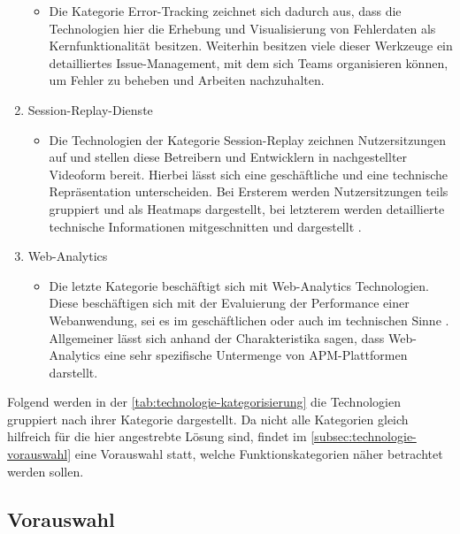 \begin{enumerate}
	\begin{itemize}
		\item Die Kategorie Error-Tracking zeichnet sich dadurch aus, dass die Technologien hier die Erhebung und Visualisierung von Fehlerdaten als Kernfunktionalität besitzen. Weiterhin besitzen viele dieser Werkzeuge ein detailliertes Issue-Management, mit dem sich Teams organisieren können, um Fehler zu beheben und Arbeiten nachzuhalten.
	\end{itemize}
	\item Session-Replay-Dienste
	\begin{itemize}
		\item Die Technologien der Kategorie Session-Replay zeichnen Nutzersitzungen auf und stellen diese Betreibern und Entwicklern in nachgestellter Videoform bereit. Hierbei lässt sich eine geschäftliche und eine technische Repräsentation unterscheiden. Bei Ersterem werden Nutzersitzungen teils gruppiert und als Heatmaps dargestellt, bei letzterem werden detaillierte technische Informationen mitgeschnitten und dargestellt \cite{Webalyt}.
	\end{itemize}
	\item Web-Analytics
	\begin{itemize}
		\item Die letzte Kategorie beschäftigt sich mit Web-Analytics Technologien. Diese beschäftigen sich mit der Evaluierung der Performance einer Webanwendung, sei es im geschäftlichen oder auch im technischen Sinne \cite{APracticalEvaluationOfWebAnalytics} \cite{WebAnalyticsAnHourADay}. Allgemeiner lässt sich anhand der Charakteristika sagen, dass Web-Analytics eine sehr spezifische Untermenge von APM-Plattformen darstellt.
	\end{itemize}
\end{enumerate}

Folgend werden in der \autoref{tab:technologie-kategorisierung} die Technologien gruppiert nach ihrer Kategorie dargestellt. Da nicht alle Kategorien gleich hilfreich für die hier angestrebte Lösung sind, findet im \autoref{subsec:technologie-vorauswahl} eine Vorauswahl statt, welche Funktionskategorien näher betrachtet werden sollen.



\subsection{Vorauswahl}
\label{subsec:technologie-vorauswahl}

